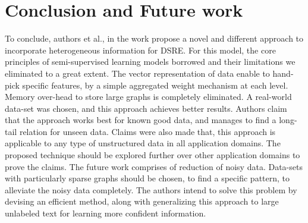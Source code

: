 \chapter{Conclusion and Future work}
\label{ch:conclusion}

To conclude, authors  et al.\cite{duan2019hybrid}, in the work  propose a novel and different approach to incorporate heterogeneous information for DSRE. For this model, the core principles of semi-supervised learning models borrowed and their limitations we eliminated to a great extent. The vector representation of data enable to hand-pick specific features, by a simple aggregated weight mechanism at each level. Memory over-head to store large graphs is completely eliminated. A real-world data-set was chosen, and this approach achieves better results. Authors claim that the approach works best for known good data, and manages to find a long-tail relation for unseen data. Claims were also made that, this approach is applicable to any type of unstructured data in all application domains. The proposed technique should be explored further over other application domains to prove the claims. The future work comprises of reduction of noisy data. Data-sets with particularly sparse graphs should be chosen, to find a specific pattern, to alleviate the noisy data completely. The authors intend to solve this problem by devising an efficient method, along with generalizing this approach to large unlabeled text for learning more confident information. 
